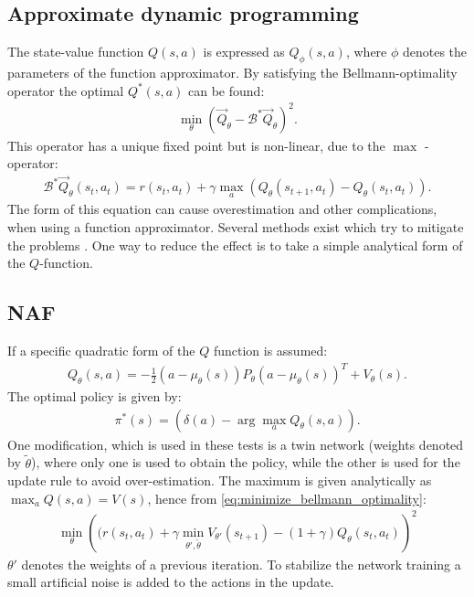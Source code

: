 \documentclass[
 reprint,
 amsmath,amssymb,amsfonts,clevref,
 aps,
prstab,
]{revtex4-2}
\begin{document}
\subsection{Approximate dynamic programming}
The state-value function $Q(s,a)$ is expressed as $Q_\phi(s,a)$, where $\phi$ denotes the parameters of the function approximator. By satisfying the Bellmann-optimality operator the optimal $Q^*(s,a)$ can be found:
\begin{align}
    \min_\theta \left(\vec Q_\theta - \mathcal{B}^*\vec Q_\theta\right)^2.\label{eq:minimize_bellmann_optimality}
\end{align}
This operator has a unique fixed point but is non-linear, due to the $\max$ - operator:
\begin{align}
 \mathcal{B}^*\vec Q_\theta(s_t,a_t) = r(s_t,a_t)+\gamma\max_a\left( Q_\theta(s_{t+1},a_t) - Q_\theta(s_t,a_t)\right).
\end{align}
The form of this equation can cause overestimation and other complications, when using a function approximator. Several methods exist which try to mitigate the problems \cite{}.
One way to reduce the effect is to take a simple analytical form of the $Q$-function.
\subsection{NAF}
If a specific quadratic form of the $Q$ function is assumed:
\begin{align}
     Q_\theta(s,a) = -\frac{1}{2}(a-\mu_\theta(s))P_\theta(a-\mu_\theta(s))^T+V_\theta(s).
\end{align}
 The optimal policy is given by:
\begin{align}
    \pi^*(s)=(\delta(a)-\arg\!\max_a Q_\theta(s,a)).
\end{align}
One modification, which is used in these tests is a twin network (weights denoted by $\tilde\theta$), where only one is used to obtain the policy, while the other is used for the update rule to avoid over-estimation.
The maximum is given analytically as $\max_a Q(s,a) = V(s)$, hence from \cref{eq:minimize_bellmann_optimality}:
\begin{align}
	\min_\theta\left( (r(s_t,a_t)+\gamma \min_{\theta\prime,\tilde \theta} V_{\theta\prime}(s_{t+1}) - (1+\gamma) Q_\theta(s_t,a_t)\right)^2
\end{align}
$\theta\prime$ denotes the weights of a previous iteration. To stabilize the network training a small artificial noise is added to the actions in the update.
\end{document}
